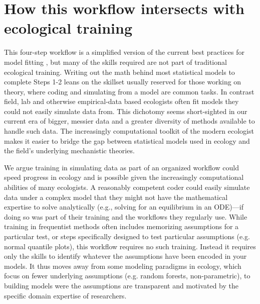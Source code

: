 \documentclass[11pt]{article}
\newcommand{\R}[1]{\label{}\linelabel{#1}}
\begin{document}
\section*{How this workflow intersects with ecological training} %

This four-step workflow is a simplified version of the current best practices for model fitting  \citep{betanworkflow,vandeschoot2021}, but many of the skills required are not part of traditional ecological training. Writing out the math behind most statistical models to complete Steps 1-2 leans on the skillset usually reserved for those working on theory, where coding and simulating from a model are common tasks. In contrast field, lab and otherwise empirical-data based ecologists often fit models they could not easily simulate data from. This dichotomy seems short-sighted in our current era of bigger, messier data and a greater diversity of methods available to handle such data. The increasingly computational toolkit of the modern ecologist makes it easier to bridge the gap between statistical models used in ecology and the field's underlying mechanistic theories.\R{huh}

We argue training in simulating data as part of an organized workflow could speed progress in ecology and is possible given the increasingly computational abilities of many ecologists. A reasonably competent coder could easily simulate data under a complex model that they might not have the mathematical expertise to solve analytically (e.g., solving for an equilibrium in an ODE)\R{ode}---if doing so was part of their training and the workflows they regularly use. While training in frequentist methods often includes memorizing assumptions for a particular test, or steps specifically designed to test particular assumptions (e.g. normal quantile plots), this workflow requires no such training. Instead it requires only the skills to identify whatever the assumptions have been encoded in your models. It thus moves away from some modeling paradigms in ecology, which focus on fewer underlying assumptions (e.g. random forests, non-parametric), to building models were the assumptions are transparent and motivated by the specific domain expertise of researchers. %
\end{document}
